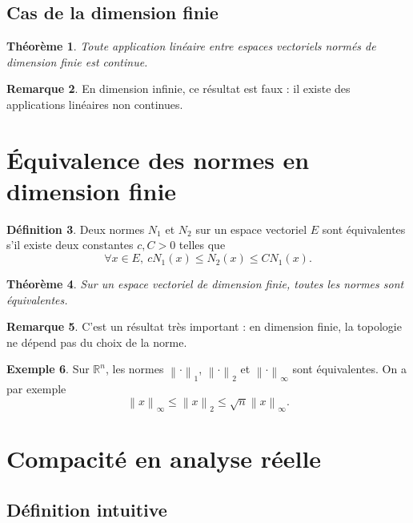 \documentclass[11pt,a4paper]{article}
\theoremstyle{definition}
\newtheorem{definition}{Définition}[section]
\newtheorem{exemple}[definition]{Exemple}
\newtheorem{remarque}[definition]{Remarque}
\theoremstyle{plain}
\newtheorem{theoreme}[definition]{Théorème}
\newcommand{\R}{\mathbb{R}}
\newcommand{\norme}[1]{\left\lVert #1 \right\rVert}
\begin{document}
\subsection{Cas de la dimension finie}

\begin{theoreme}
Toute application linéaire entre espaces vectoriels normés de dimension finie est continue.
\end{theoreme}

\begin{remarque}
En dimension infinie, ce résultat est faux : il existe des applications linéaires non continues.
\end{remarque}

\section{Équivalence des normes en dimension finie}

\begin{definition}
Deux normes $N_1$ et $N_2$ sur un espace vectoriel $E$ sont équivalentes s'il existe deux constantes $c,C>0$ telles que
\[
\forall x\in E,\ cN_1(x)\leq N_2(x)\leq C N_1(x).
\]
\end{definition}

\begin{theoreme}
Sur un espace vectoriel de dimension finie, toutes les normes sont équivalentes.
\end{theoreme}

\begin{remarque}
C'est un résultat très important : en dimension finie, la topologie ne dépend pas du choix de la norme.
\end{remarque}

\begin{exemple}
Sur $\R^n$, les normes $\norme{\cdot}_1$, $\norme{\cdot}_2$ et $\norme{\cdot}_\infty$ sont équivalentes.
On a par exemple
\[
\norme{x}_\infty\leq \norme{x}_2\leq \sqrt n \norme{x}_\infty.
\]
\end{exemple}

\section{Compacité en analyse réelle}

\subsection{Définition intuitive}
\end{document}
